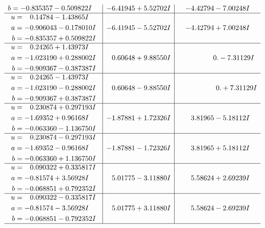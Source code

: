 \documentclass[1p]{elsarticle_modified}
\theoremstyle{definition}
\begin{document}
$$\begin{array}{c|c|c}
\begin{aligned}
b &= -0.835357 - 0.509822 I\end{aligned}
 & -6.41945 + 5.52702 I & -4.42794 - 7.00248 I \\ \hline\begin{aligned}
u &= \phantom{-}0.14784 - 1.43865 I \\
a &= -0.906043 - 0.178010 I \\
b &= -0.835357 + 0.509822 I\end{aligned}
 & -6.41945 - 5.52702 I & -4.42794 + 7.00248 I \\ \hline\begin{aligned}
u &= \phantom{-}0.24265 + 1.43973 I \\
a &= -1.023190 + 0.288002 I \\
b &= -0.909367 - 0.387387 I\end{aligned}
 & \phantom{-}0.60648 + 9.88550 I & \phantom{-0.000000 } 0. - 7.31129 I \\ \hline\begin{aligned}
u &= \phantom{-}0.24265 - 1.43973 I \\
a &= -1.023190 - 0.288002 I \\
b &= -0.909367 + 0.387387 I\end{aligned}
 & \phantom{-}0.60648 - 9.88550 I & \phantom{-0.000000 -}0. + 7.31129 I \\ \hline\begin{aligned}
u &= \phantom{-}0.230874 + 0.297193 I \\
a &= -1.69352 + 0.96168 I \\
b &= -0.063360 - 1.136750 I\end{aligned}
 & -1.87881 + 1.72326 I & \phantom{-}3.81965 - 5.18112 I \\ \hline\begin{aligned}
u &= \phantom{-}0.230874 - 0.297193 I \\
a &= -1.69352 - 0.96168 I \\
b &= -0.063360 + 1.136750 I\end{aligned}
 & -1.87881 - 1.72326 I & \phantom{-}3.81965 + 5.18112 I \\ \hline\begin{aligned}
u &= \phantom{-}0.090322 + 0.335817 I \\
a &= -0.81574 + 3.56928 I \\
b &= -0.068851 + 0.792352 I\end{aligned}
 & \phantom{-}5.01775 - 3.11880 I & \phantom{-}5.58624 + 2.69239 I \\ \hline\begin{aligned}
u &= \phantom{-}0.090322 - 0.335817 I \\
a &= -0.81574 - 3.56928 I \\
b &= -0.068851 - 0.792352 I\end{aligned}
 & \phantom{-}5.01775 + 3.11880 I & \phantom{-}5.58624 - 2.69239 I\\
 \hline 
 \end{array}$$\newpage\newpage\renewcommand{\arraystretch}{1}
\end{document}
